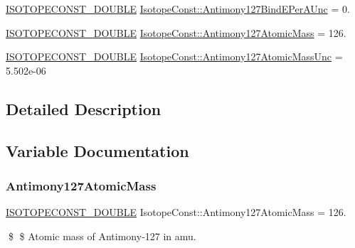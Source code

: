 \begin{DoxyCompactItemize}
\mbox{\hyperlink{group___isotope_const-_macros_ga8f45a7272ce02c0b4c65c44636ed719a}{I\+S\+O\+T\+O\+P\+E\+C\+O\+N\+S\+T\+\_\+\+D\+O\+U\+B\+LE}} \mbox{\hyperlink{group___isotope_const-_antimony-_sb127_ga0ac64116de4815954961a48411072939}{Isotope\+Const\+::\+Antimony127\+Bind\+E\+Per\+A\+Unc}} = 0.
\item 
\mbox{\hyperlink{group___isotope_const-_macros_ga8f45a7272ce02c0b4c65c44636ed719a}{I\+S\+O\+T\+O\+P\+E\+C\+O\+N\+S\+T\+\_\+\+D\+O\+U\+B\+LE}} \mbox{\hyperlink{group___isotope_const-_antimony-_sb127_gac2eec2321189d221becaf95c07beab6e}{Isotope\+Const\+::\+Antimony127\+Atomic\+Mass}} = 126.
\item 
\mbox{\hyperlink{group___isotope_const-_macros_ga8f45a7272ce02c0b4c65c44636ed719a}{I\+S\+O\+T\+O\+P\+E\+C\+O\+N\+S\+T\+\_\+\+D\+O\+U\+B\+LE}} \mbox{\hyperlink{group___isotope_const-_antimony-_sb127_ga0cb35aef0a1cdf8099fd328a4b00c9ec}{Isotope\+Const\+::\+Antimony127\+Atomic\+Mass\+Unc}} = 5.\+502e-\/06
\end{DoxyCompactItemize}


\subsection{Detailed Description}


\subsection{Variable Documentation}
\mbox{\label{group___isotope_const-_antimony-_sb127_gac2eec2321189d221becaf95c07beab6e}} 
\subsubsection{\texorpdfstring{Antimony127\+Atomic\+Mass}{Antimony127AtomicMass}}
{\footnotesize\ttfamily \mbox{\hyperlink{group___isotope_const-_macros_ga8f45a7272ce02c0b4c65c44636ed719a}{I\+S\+O\+T\+O\+P\+E\+C\+O\+N\+S\+T\+\_\+\+D\+O\+U\+B\+LE}} Isotope\+Const\+::\+Antimony127\+Atomic\+Mass = 126.}

\$ \$ Atomic mass of Antimony-\/127 in amu. \mbox{\label{group___isotope_const-_antimony-_sb127_ga0cb35aef0a1cdf8099fd328a4b00c9ec}} 

